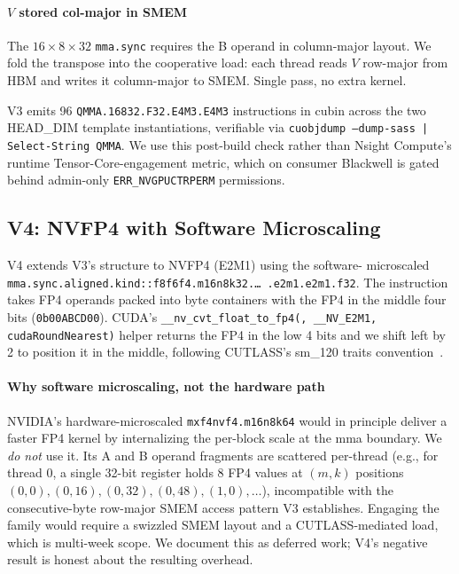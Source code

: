\documentclass[conference]{IEEEtran}
\begin{document}
\paragraph*{$V$ stored col-major in SMEM}
The $16{\times}8{\times}32$ \texttt{mma.sync} requires the B operand
in column-major layout. We fold the transpose into the cooperative
load: each thread reads $V$ row-major from HBM and writes it
column-major to SMEM. Single pass, no extra kernel.

V3 emits 96 \texttt{QMMA.16832.F32.E4M3.E4M3} instructions in cubin
across the two HEAD\_DIM template instantiations, verifiable via
\texttt{cuobjdump --dump-sass | Select-String QMMA}. We use this
post-build check rather than Nsight Compute's runtime
Tensor-Core-engagement metric, which on consumer Blackwell is gated
behind admin-only \texttt{ERR\_NVGPUCTRPERM} permissions.

\subsection{V4: NVFP4 with Software Microscaling}
\label{sec:method:v4}

V4 extends V3's structure to NVFP4 (E2M1) using the software-
microscaled \texttt{mma.sync.aligned.kind::f8f6f4.m16n8k32.\dots\
.e2m1.e2m1.f32}. The instruction takes FP4 operands packed into
byte containers with the FP4 in the middle four bits
(\texttt{0b00ABCD00}). CUDA's
\texttt{\_\_nv\_cvt\_float\_to\_fp4(\textperiodcentered, \_\_NV\_E2M1,
cudaRoundNearest)} helper returns the FP4 in the low 4 bits and we
shift left by 2 to position it in the middle, following CUTLASS's
sm\_120 traits convention~\cite{nvidia2024cutlass}.

\paragraph*{Why software microscaling, not the hardware path}
NVIDIA's hardware-microscaled \texttt{mxf4nvf4.m16n8k64} would in
principle deliver a faster FP4 kernel by internalizing the per-block
scale at the mma boundary. We \emph{do not} use it. Its A and B
operand fragments are scattered per-thread (e.g., for thread 0, a
single 32-bit register holds 8 FP4 values at $(m,k)$ positions
$(0,0), (0,16), (0,32), (0,48), (1,0), \ldots$), incompatible with
the consecutive-byte row-major SMEM access pattern V3 establishes.
Engaging the family would require a swizzled SMEM layout and a
CUTLASS-mediated load, which is multi-week scope. We document this
as deferred work; V4's negative result is honest about the
resulting overhead.
\end{document}
